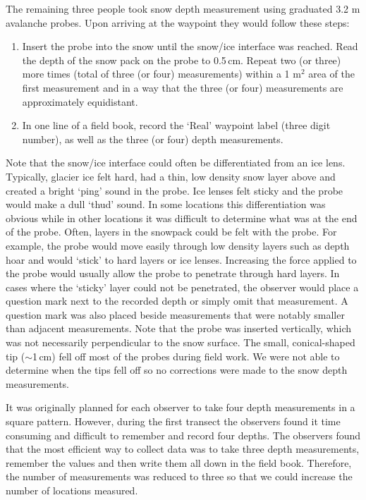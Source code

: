 \documentclass{sfuthesis}
\begin{document}
The remaining three people took snow depth measurement using graduated 3.2 m avalanche probes. Upon arriving at the waypoint they would follow these steps:
\begin{enumerate}
\item Insert the probe into the snow until the snow/ice interface was reached. Read the depth of the snow pack on the probe to 0.5\,cm. Repeat two (or three) more times (total of three (or four) measurements) within a 1 m$^2$ area of the first measurement and in a way that the three (or four) measurements are approximately equidistant. 
\item In one line of a field book, record the `Real' waypoint label (three digit number), as well as the three (or four) depth measurements. 
\end{enumerate}
Note that the snow/ice interface could often be differentiated from an ice lens. Typically, glacier ice felt hard, had a thin, low density snow layer above and created a bright `ping' sound in the probe. Ice lenses felt sticky and the probe would make a dull `thud' sound. In some locations this differentiation was obvious while in other locations it was difficult to determine what was at the end of the probe. Often, layers in the snowpack could be felt with the probe. For example, the probe would move easily through low density layers such as depth hoar and would `stick' to hard layers or ice lenses. Increasing the force applied to the probe would usually allow the probe to penetrate through hard layers. In cases where the `sticky' layer could not be penetrated, the observer would place a question mark next to the recorded depth or simply omit that measurement. A question mark was also placed beside measurements that were notably smaller than adjacent measurements. Note that the probe was inserted vertically, which was not necessarily perpendicular to the snow surface. The small, conical-shaped tip ($\sim$1\,cm) fell off most of the probes during field work. We were not able to determine when the tips fell off so no corrections were made to the snow depth measurements. 

It was originally planned for each observer to take four depth measurements in a square pattern. However, during the first transect the observers found it time consuming and difficult to remember and record four depths. The observers found that the most efficient way to collect data was to take three depth measurements, remember the values and then write them all down in the field book. Therefore, the number of measurements was reduced to three so that we could increase the number of locations measured. 
\end{document}
